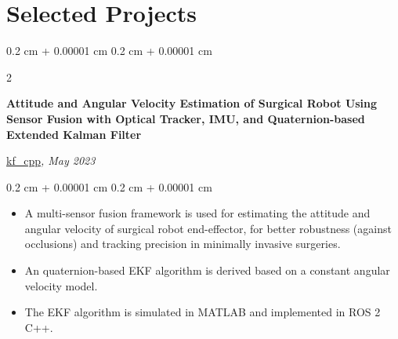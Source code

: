 \documentclass[10pt, letterpaper]{article}
\newenvironment{highlights}{
    \begin{itemize}[
        topsep=0.10 cm,
        parsep=0.10 cm,
        partopsep=0pt,
        itemsep=0pt,
        leftmargin=0.4 cm + 10pt
    ]
}{
    \end{itemize}
} %
\newenvironment{onecolentry}{
    \begin{adjustwidth}{
        0.2 cm + 0.00001 cm
    }{
        0.2 cm + 0.00001 cm
    }
}{
    \end{adjustwidth}
} %
\newenvironment{twocolentry}[2][]{
    \onecolentry
    \def\secondColumn{#2}
    \setcolumnwidth{\fill, 4.5 cm}
    \begin{paracol}{2}
}{
    \switchcolumn \raggedleft \secondColumn
    \end{paracol}
    \endonecolentry
} %
\let\hrefWithoutArrow\href
\renewcommand{\href}[2]{\hrefWithoutArrow{#1}{\ifthenelse{\equal{#2}{}}{ }{#2 }\raisebox{.15ex}{\footnotesize \faExternalLink*}}}
\begin{document}






    \section{Selected Projects}

        \begin{twocolentry}{
            \hrefWithoutArrow{https://github.com/wei-hsuan-cheng/kf_cpp}{{\footnotesize\faGithub}\hspace*{0.13cm}kf\_cpp}\textit{, May 2023}
            }

            \textbf{Attitude and Angular Velocity Estimation of Surgical Robot Using Sensor Fusion with Optical Tracker, IMU, and Quaternion-based Extended Kalman Filter}
        \end{twocolentry}
        \vspace{0.10 cm}
        \begin{onecolentry}
            \begin{highlights}
                \item A multi-sensor fusion framework is used for estimating the attitude and angular velocity of surgical robot end-effector, for better robustness (against occlusions) and tracking precision in minimally invasive surgeries.
                \item An quaternion-based EKF algorithm is derived based on a constant angular velocity model.
                \item The EKF algorithm is simulated in MATLAB and implemented in ROS 2 C++.
            \end{highlights}
        \end{onecolentry}
\end{document}
